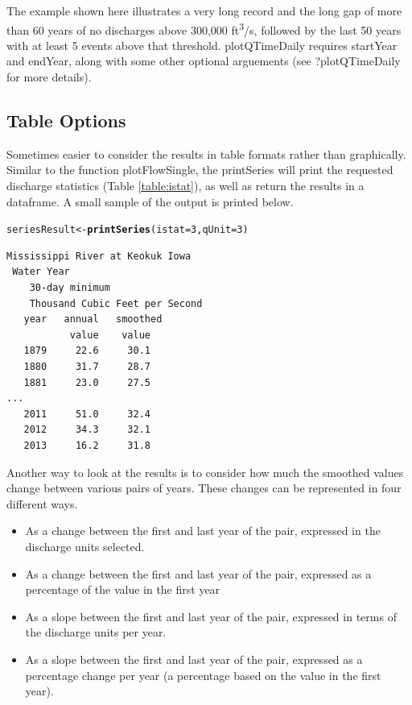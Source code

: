 \documentclass[a4paper,11pt]{article}\usepackage{graphicx, color}
\makeatletter
\newcommand{\hlfunctioncall}[1]{\textcolor[rgb]{0.501960784313725,0,0.329411764705882}{\textbf{#1}}}%
\newenvironment{kframe}{%
 \def\at@end@of@kframe{}%
 \ifinner\ifhmode%
  \def\at@end@of@kframe{\end{minipage}}%
  \begin{minipage}{\columnwidth}%
 \fi\fi%
 \def\FrameCommand##1{\hskip\@totalleftmargin \hskip-\fboxsep
 \colorbox{shadecolor}{##1}\hskip-\fboxsep
     \hskip-\linewidth \hskip-\@totalleftmargin \hskip\columnwidth}%
 \MakeFramed {\advance\hsize-\width
   \@totalleftmargin\z@ \linewidth\hsize
   \@setminipage}}%
 {\par\unskip\endMakeFramed%
 \at@end@of@kframe}
\newenvironment{knitrout}{}{} %
\makeatother
\begin{document}
\begin{knitrout}
\end{knitrout}


The example shown here illustrates a very long record and the long gap of more than 60 years of no discharges above 300,000 ft\textsuperscript{3}/s, followed by the last 50 years with at least 5 events above that threshold. plotQTimeDaily requires startYear and endYear, along with some other optional arguements (see ?plotQTimeDaily for more details).

\FloatBarrier

\subsection{Table Options}
\label{sec:tableOptions}
Sometimes easier to consider the results in table formats rather than graphically. Similar to the function plotFlowSingle, the printSeries will print the requested discharge statistics (Table \ref{table:istat}), as well as return the results in a dataframe. A small sample of the output is printed below.


\begin{knitrout}
\color{fgcolor}\begin{kframe}
\begin{alltt}
seriesResult <- \hlfunctioncall{printSeries}(istat=3, qUnit=3)
\end{alltt}
\end{kframe}
\end{knitrout}


\begin{verbatim}
Mississippi River at Keokuk Iowa
 Water Year
    30-day minimum
    Thousand Cubic Feet per Second
   year   annual   smoothed
           value    value
   1879     22.6     30.1
   1880     31.7     28.7
   1881     23.0     27.5
...
   2011     51.0     32.4
   2012     34.3     32.1
   2013     16.2     31.8
\end{verbatim}

Another way to look at the results is to consider how much the smoothed values change between various pairs of years.  These changes can be represented in four different ways.  
\begin{itemize}
  \item As a change between the first and last year of the pair, expressed in the discharge units selected.
  \item As a change between the first and last year of the pair, expressed as a percentage of the value in the first year
  \item As a slope between the first and last year of the pair, expressed in terms of the discharge units per year.
  \item As a slope between the first and last year of the pair, expressed as a percentage change per year (a percentage based on the value in the first year).
\end{itemize}
\end{document}
